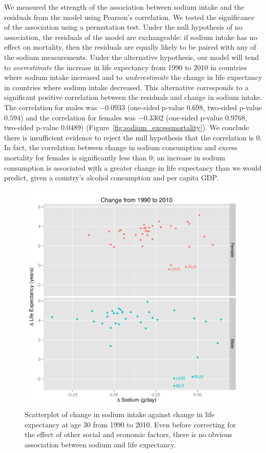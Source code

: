 \documentclass{article}
\begin{document}
We measured the strength of the association between sodium intake and the residuals from the model using Pearson's correlation. We tested the significance of the association using a permutation test.  Under the null hypothesis of no association, the residuals of the model are exchangeable: if sodium intake has no effect on mortality, then the residuals are equally likely to be paired with any of the sodium measurements.  Under the alternative hypothesis, our model will tend to \textit{overestimate} the increase in life expectancy from 1990 to 2010 in countries where sodium intake increased and to \textit{underestimate} the change in life expectancy in countries where sodium intake decreased. This alternative corresponds to a significant positive correlation between the residuals and change in sodium intake.  The correlation for males was $-0.0933$ (one-sided p-value $0.698$, two-sided p-value $0.594$) and the correlation for females was $-0.3302$ (one-sided p-value $0.9768$, two-sided p-value $0.0489$) (Figure~\ref{fig:sodium_excessmortality}). We conclude there is insufficient evidence to reject the null hypothesis that the correlation is $0$.  In fact, the correlation between change in sodium consumption and excess mortality for females is significantly less than $0$; an increase in sodium consumption is associated with a greater change in life expectancy than we would predict, given a country's alcohol consumption and per capita GDP. \\



\begin{figure}
\centering
\includegraphics[scale = 0.5]{sodium_lifeexp.pdf}
\caption{Scatterplot of change in sodium intake against change in life expectancy at age 30 from 1990 to 2010. Even before correcting for the effect of other social and economic factors, there is no obvious association between sodium and life expectancy.}\label{fig:sodium_lifeexp}
\end{figure}
\end{document}
